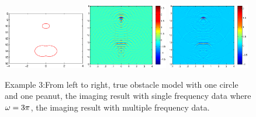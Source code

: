 \documentclass[11pt]{iopart}
\begin{document}
\begin{figure}
	\centering
	\includegraphics[width=0.32\textwidth,height=0.16\textheight]{./graphic/circle_0_4_peanut_1_profile.eps}
	\includegraphics[width=0.32\textwidth]{./graphic/circle_0_4_peanut_1_3pi_1.eps}
	\includegraphics[width=0.32\textwidth]{./graphic/circle_0_4_peanut_1_multi_1.eps}
	
	\caption{Example 3:From left to right,  true obstacle model with one circle and one peanut, the imaging result
		with single frequency data where $\omega=3\pi$, the imaging result with multiple frequency data.}\label{figure_32}
\end{figure}
\end{document}
